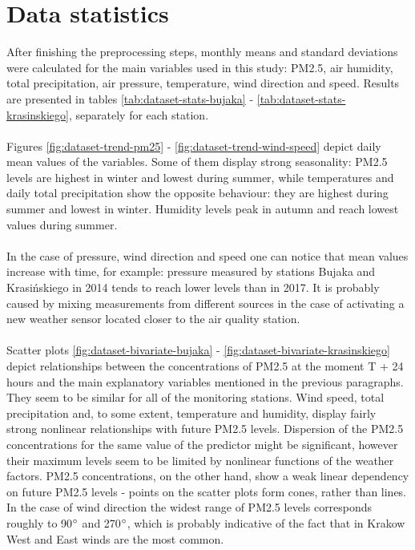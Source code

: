 \section{Data statistics}
After finishing the preprocessing steps, monthly means and standard deviations were calculated for the main variables used in this study: PM2.5, air humidity, total precipitation, air pressure, temperature, wind direction and speed. Results are presented in tables \ref{tab:dataset-stats-bujaka} - \ref{tab:dataset-stats-krasinskiego}, separately for each station.
\\\\
Figures \ref{fig:dataset-trend-pm25} - \ref{fig:dataset-trend-wind-speed} depict daily mean values of the variables. Some of them display strong seasonality: PM2.5 levels are highest in winter and lowest during summer, while temperatures and daily total precipitation show the opposite behaviour: they are highest during summer and lowest in winter. Humidity levels peak in autumn and reach lowest values during summer. 
\\\\
In the case of pressure, wind direction and speed one can notice that mean values increase with time, for example: pressure measured by stations Bujaka and Krasińskiego in 2014 tends to reach lower levels than in 2017. It is probably caused by mixing measurements from different sources in the case of activating a new weather sensor located closer to the air quality station.
\\\\
Scatter plots \ref{fig:dataset-bivariate-bujaka} - \ref{fig:dataset-bivariate-krasinskiego} depict relationships between the concentrations of PM2.5 at the moment T + 24 hours and the main explanatory variables mentioned in the previous paragraphs. They seem to be similar for all of the monitoring stations. Wind speed, total precipitation and, to some extent, temperature and humidity, display fairly strong nonlinear relationships with future PM2.5 levels. Dispersion of the PM2.5 concentrations for the same value of the predictor might be significant, however their maximum levels seem to be limited by nonlinear functions of the weather factors. PM2.5 concentrations, on the other hand, show a weak linear dependency on future PM2.5 levels - points on the scatter plots form cones, rather than lines. In the case of wind direction the widest range of PM2.5 levels corresponds roughly to 90$\degree$ and 270$\degree$, which is probably indicative of the fact that in Krakow West and East winds are the most common. 
